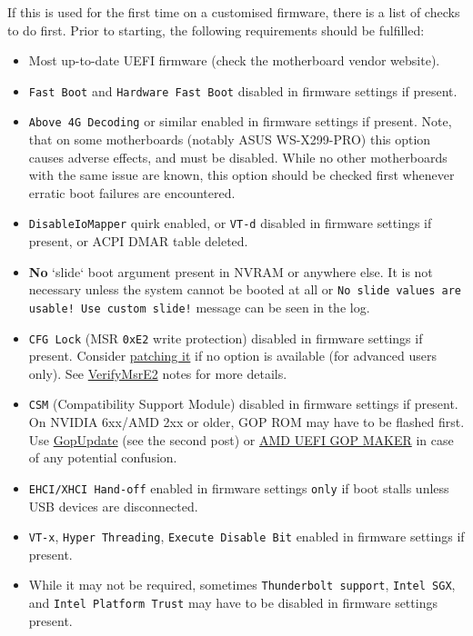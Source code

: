 \documentclass[]{article}
\providecommand{\tightlist}{%
  \setlength{\itemsep}{0pt}\setlength{\parskip}{0pt}}
\begin{document}
If this is used for the first time on a customised firmware, there is a
list of checks to do first. Prior to starting, the following requirements should be fulfilled:

\begin{itemize}
\tightlist
\item Most up-to-date UEFI firmware (check the motherboard vendor website).
\item \texttt{Fast Boot} and \texttt{Hardware Fast Boot} disabled in firmware
  settings if present.
\item \texttt{Above 4G Decoding} or similar enabled in firmware
  settings if present. Note, that on some motherboards (notably ASUS WS-X299-PRO) this
  option causes adverse effects, and must be disabled. While no other motherboards
  with the same issue are known, this option should be checked first whenever erratic boot
  failures are encountered.
\item \texttt{DisableIoMapper} quirk enabled, or \texttt{VT-d} disabled in
  firmware settings if present, or ACPI DMAR table deleted.
\item \textbf{No} `slide` boot argument present in NVRAM or anywhere else.
  It is not necessary unless the system cannot be booted at all or
  \texttt{No slide values are usable! Use custom slide!} message can be seen in the log.
\item \texttt{CFG Lock} (MSR \texttt{0xE2} write protection) disabled in
  firmware settings if present. Consider
\href{https://github.com/LongSoft/UEFITool/blob/master/UEFIPatch/patches.txt}{patching it}
  if no option is available (for advanced users only). See
\hyperref[kernelpropsquirks]{VerifyMsrE2}
  notes for more details.
\item \texttt{CSM} (Compatibility Support Module) disabled in firmware settings
  if present. On NVIDIA 6xx/AMD 2xx or older, GOP ROM may have to be flashed first. Use
  \href{https://www.win-raid.com/t892f16-AMD-and-Nvidia-GOP-update-No-requests-DIY.html}{GopUpdate}
  (see the second post) or \href{http://www.insanelymac.com/forum/topic/299614-asus-eah6450-video-bios-uefi-gop-upgrade-and-gop-uefi-binary-in-efi-for-many-ati-cards/page-1#entry2042163}{AMD UEFI GOP MAKER}
  in case of any potential confusion.
\item \texttt{EHCI/XHCI Hand-off} enabled in firmware settings \texttt{only} if boot
  stalls unless USB devices are disconnected.
\item \texttt{VT-x}, \texttt{Hyper Threading}, \texttt{Execute Disable Bit} enabled
  in firmware settings if present.
\item While it may not be required, sometimes
  \texttt{Thunderbolt support}, \texttt{Intel SGX}, and \texttt{Intel Platform Trust}
  may have to be disabled in firmware settings present.
\end{itemize}
\end{document}
